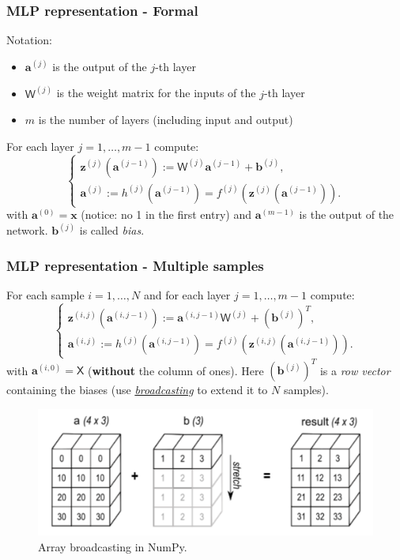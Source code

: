 \documentclass{beamer}
\begin{document}
	\begin{frame}
		\frametitle{MLP representation - Formal}
		Notation: 
		\begin{itemize}
			\item $\bm{a}^{(j)}$ is the output of the $j$-th layer
			\item $\mathsf{W}^{(j)}$ is the weight matrix for the inputs of the $j$-th layer
			\item $m$ is the number of layers (including input and output)
		\end{itemize}
				
		\vspace{5mm}
				
		For each layer $j = 1, \dots, m-1$ compute:
		\begin{equation*}
			\begin{cases}
				\bm{z}^{(j)}(\bm{a}^{(j-1)}) := \mathsf{W}^{(j)} \bm{a}^{(j-1)} + \bm{b}^{(j)},\\
				\bm{a}^{(j)} := h^{(j)}(\bm{a}^{(j-1)}) = f^{(j)}(\bm{z}^{(j)}(\bm{a}^{(j-1)})).
			\end{cases}
		\end{equation*}
		with 
		$\bm{a}^{(0)} = \bm{x}$ (notice: no 1 in the first entry) and $\bm{a}^{(m-1)}$ is the output of the network. $\bm{b}^{(j)}$ is called \textit{bias}.

	\end{frame}

	\begin{frame}
		\frametitle{MLP representation - Multiple samples}
			For each sample $i=1,\dots, N$ and for each layer $j = 1, \dots, m-1$ compute:
		\begin{equation*}
			\begin{cases}
				\bm{z}^{(i,j)}(\bm{a}^{(i,j-1)}) := \bm{a}^{(i,j-1)}\mathsf{W}^{(j)}  + (\bm{b}^{(j)})^T,\\
				\bm{a}^{(i,j)} := h^{(j)}(\bm{a}^{(i,j-1)}) = f^{(j)}(\bm{z}^{(i,j)}(\bm{a}^{(i,j-1)})).
			\end{cases}
		\end{equation*}
		with $\bm{a}^{(i,0)} = \mathsf{X}$ (\textbf{without} the column of ones). Here $(\bm{b}^{(j)})^T$ is a \textit{row vector} containing the biases (use \href{https://numpy.org/doc/stable/user/basics.broadcasting.html}{\textit{broadcasting}} to extend it to $N$ samples).
		
		\begin{figure}
			\centering
			\includegraphics[scale=0.3]{images/broadcasting.png}
			\caption{Array broadcasting in NumPy.}
			\label{fig:broadcasting}
		\end{figure}
		
	\end{frame}
\end{document}
